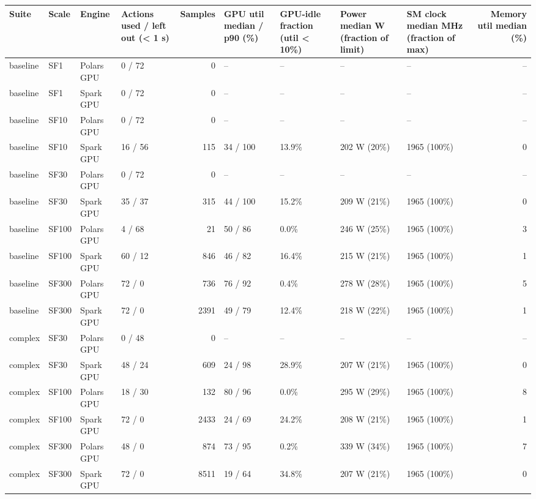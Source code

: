 \begin{longtable}{llllrllllr}
\toprule
Suite & Scale & Engine & Actions used / left out (< 1 s) & Samples & GPU util median / p90 (\%) & GPU-idle fraction (util < 10\%) & Power median W (fraction of limit) & SM clock median MHz (fraction of max) & Memory util median (\%) \\
\midrule
\endhead
\bottomrule
\endfoot
baseline & SF1 & Polars GPU & 0 / 72 & 0 & -- & -- & -- & -- & -- \\
baseline & SF1 & Spark GPU & 0 / 72 & 0 & -- & -- & -- & -- & -- \\
baseline & SF10 & Polars GPU & 0 / 72 & 0 & -- & -- & -- & -- & -- \\
baseline & SF10 & Spark GPU & 16 / 56 & 115 & 34 / 100 & 13.9\% & 202 W (20\%) & 1965 (100\%) & 0 \\
baseline & SF30 & Polars GPU & 0 / 72 & 0 & -- & -- & -- & -- & -- \\
baseline & SF30 & Spark GPU & 35 / 37 & 315 & 44 / 100 & 15.2\% & 209 W (21\%) & 1965 (100\%) & 0 \\
baseline & SF100 & Polars GPU & 4 / 68 & 21 & 50 / 86 & 0.0\% & 246 W (25\%) & 1965 (100\%) & 3 \\
baseline & SF100 & Spark GPU & 60 / 12 & 846 & 46 / 82 & 16.4\% & 215 W (21\%) & 1965 (100\%) & 1 \\
baseline & SF300 & Polars GPU & 72 / 0 & 736 & 76 / 92 & 0.4\% & 278 W (28\%) & 1965 (100\%) & 5 \\
baseline & SF300 & Spark GPU & 72 / 0 & 2391 & 49 / 79 & 12.4\% & 218 W (22\%) & 1965 (100\%) & 1 \\
complex & SF30 & Polars GPU & 0 / 48 & 0 & -- & -- & -- & -- & -- \\
complex & SF30 & Spark GPU & 48 / 24 & 609 & 24 / 98 & 28.9\% & 207 W (21\%) & 1965 (100\%) & 0 \\
complex & SF100 & Polars GPU & 18 / 30 & 132 & 80 / 96 & 0.0\% & 295 W (29\%) & 1965 (100\%) & 8 \\
complex & SF100 & Spark GPU & 72 / 0 & 2433 & 24 / 69 & 24.2\% & 208 W (21\%) & 1965 (100\%) & 1 \\
complex & SF300 & Polars GPU & 48 / 0 & 874 & 73 / 95 & 0.2\% & 339 W (34\%) & 1965 (100\%) & 7 \\
complex & SF300 & Spark GPU & 72 / 0 & 8511 & 19 / 64 & 34.8\% & 207 W (21\%) & 1965 (100\%) & 0 \\
\end{longtable}
